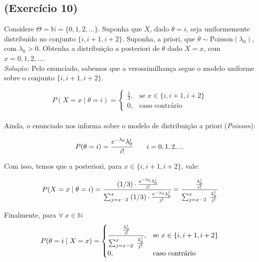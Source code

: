 \subsection*{(Exercício 10)} Considere \( \Theta = \mathbb{N} = \{0, 1, 2, \dots\} \). Suponha que \( X \), dado \( \theta = i \), seja uniformemente distribuído no conjunto \( \{i, i+1, i+2\} \). Suponha, a priori, que \( \theta \sim \text{Poisson}(\lambda_0) \), com \( \lambda_0 > 0 \). Obtenha a distribuição a posteriori de \( \theta \) dado \( X = x \), com \( x = 0, 1, 2, \dots \).\\

\textit{Solução: } Pelo enunciado, sabemos que a verossimilhança segue o modelo uniforme sobre o conjunto $\{i, i+1, i+2\}$.

\[
P(X=x\;|\; \theta=i) = 
\begin{cases}
\frac{1}{3}, & \text{se } x \in \{i, i+1, i+2\} \\
0, & \text{caso contrário}
\end{cases}
\]\\

Ainda, o enunciado nos informa sobre o modelo de distribuição a priori (\textit{Poisson}):

$$P(\theta=i) = \cfrac{e^{-\lambda_0} \lambda_0^i}{i!} \qquad i=0, 1 ,2,...$$

Com isso, temos que a posteriori, para $x \in \{i, i+1, i+2\}$, vale:

$$P(X=x\;|\; \theta =i) = \cfrac{(1/3)\cdot \frac{e^{-\lambda_0} \lambda_0^i}{i!}}{\sum_{j=x-2}^x \;(1/3)\cdot \frac{e^{-\lambda_0} \lambda_0^j}{j!}} = \cfrac{\frac{\lambda_0^i}{i!}}{\sum_{j=x-2}^x \; \frac{\lambda_0^j}{j!}}$$

Finalmente, para $\forall \; x\in\mathbb{N}$
\[
P(\theta=i\;|\; X=x) =
\begin{cases}
     \cfrac{\frac{\lambda_0^i}{i!}}{\sum_{j=x-2}^x \; \frac{\lambda_0^j}{j!}}, &\text{se  }x \in \{i, i+1, i+2\}\\
     0, &\text{caso contrário }
\end{cases}
\]


